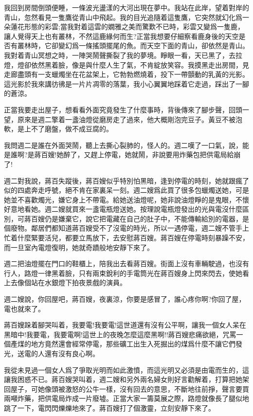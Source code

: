 \documentclass[a6paper]{article}
\begin{document}
我回到房間倒頭便睡，一條波光盪漾的大河出現在夢中。我站在此岸，望着對岸的青山，忽然看見一隻鷹從青山中飛起。我的目光追隨着這隻鷹，它突然就幻化爲一朵蓮花形態的彩雲;當我對着這雲的嫺雅之美而驚歎不已時，彩雲又變爲一隻鹿，讓人覺得天上也有叢林，不然這鹿緣何而生?正當我想要仔細察看鹿身後的天空是否有叢林時，它卻變幻爲一條搖頭擺尾的魚。而天空下面的青山，卻依然是青山。我對着青山冥想之時，一陣哭鬧聲撕裂了我的夢境。睜眼一看，天已黑了，去拉燈，燈卻依然黑着臉，像是與什麼人生了氣，不肯綻放笑容。我摸黑走出房間，見走廊盡頭有一支蠟燭坐在花盆架上，它勃勃燃燒着，投下一帶顫動的乳黃的光影。這光影於我來講彷彿是一片片凋零的落葉，我小心翼翼地踩着它走過，踩出了一腳的蒼涼。

正當我要走出屋子，想看看外面究竟發生了什麼事時，背後傳來了腳步聲，回頭一望，原來是週二擎着一盞油燈從磨房走了過來，他大概剛泡完豆子。黃豆不被泡軟，是上不了磨盤，做不成豆腐的。

我問週二是誰在外面哭鬧，聽上去撕心裂肺的，怪人的。週二嘆了一口氣，說，能是誰啊?是蔣百嫂!她醉了，又趕上停電，她就鬧，非說要用炸藥包把供電局給崩了!

週二對我說，蔣百失蹤後，蔣百嫂似乎特別怕黑暗，逢到停電的時刻，她就跟瘋了似的四處奔走呼號，絕不肯在家裏呆一刻。週二嫂爲此買了很多包蠟燭送她，可是她並不喜歡燭光，嫌它身上不帶電。給她送油燈呢，她非說油燈睜的是鬼眼，不懷好意地看她。週二嫂就買來一盞電瓶燈送她。按理說電瓶燈發出的光與電沒什麼區別，可蔣百嫂仍是嫌棄它，說它把電藏在自己的肚子中，不能傳輸給別的電器，是個廢物。鄰居們都知道蔣百嫂受不了沒電的時光，所以一遇停電，週二嫂不管手上忙着什麼緊要活兒，都要立馬放下，去安慰蔣百嫂。蔣百嫂在停電時刻暴躁不安，而一旦室內電燈復明，她就奇蹟般地安靜下來了。

週二把油燈擺在門口的鞋櫃上，陪我出去看蔣百嫂。街面上沒有車輛駛過，也沒有行人，路燈一律黑着臉，只有兩束銳利的手電筒光在蔣百嫂身上閃來閃去，使她看上去像個站在水銀燈下拍夜景戲的演員。

週二嫂說，你回屋吧，蔣百嫂，夜裏涼，你要是感冒了，誰心疼你啊?你回了屋，電也就來了。

蔣百嫂跺着腳哭叫着，我要電!我要電!這世道還有沒有公平啊，讓我一個女人呆在黑暗中!我要電，我要電啊!這世上的夜晚怎麼這麼黑啊!!蔣百嫂悲痛欲絕，咒罵一個產煤的地方竟然還會經常停電，那些礦工出生入死掘出的煤爲什麼不讓它們發光，送電的人還有沒有良心啊。

我從未見過一個女人爲了爭取光明而如此激憤，而這光明又必須是由電而生的，這讓我困惑不已。蔣百嫂哭叫着，週二嫂和另外兩名婦女則好言勸解着，打算把她架回屋子，可她像頭被激怒的公牛一樣，沒有回去的意思，不斷地往前掙，聲言要買兩噸炸藥，把供電局炸成一片廢墟。正當大家一籌莫展之際，路燈就像長了腿似地跳了一下，電閃閃爍爍地來了。蔣百嫂打了個激靈，立刻安靜下來了。
\end{document}
